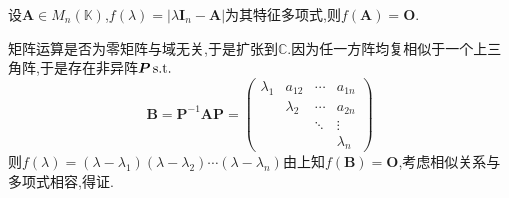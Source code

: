 \begin{formal}
\begin{theorem}\label{thm:Cayley-Hamilton定理}
    设$\bm{A}\in M_n\left(
        \mathbb{K}
    \right)$,$f\left(\lambda\right)=\left|
    \lambda\bm{I}_n-\bm{A}
    \right|$为其特征多项式,则$f\left(\bm{A}\right)=\bm{O}$.
\end{theorem}
\begin{Proof}
矩阵运算是否为零矩阵与域无关,于是扩张到$\mathbb{C}.$因为任一方阵均复相似于一个上三角阵,于是存在非异阵$\bm{P}\,\textup{s.t.}$
\[
\bm{B}=\bm{P}^{-1}\bm{AP}=\begin{pmatrix}
    \lambda_1&a_{12}&\cdots&a_{1n}\\
    &\lambda_2&\cdots&a_{2n}\\
    &&\ddots&\vdots\\
    &&&\lambda_n
\end{pmatrix}
\]则$f\left(\lambda\right)=
\left(
    \lambda-\lambda_1
\right)\left(
    \lambda-\lambda_2
\right)\cdots\left(
    \lambda-\lambda_n
\right)
    $由上知$f\left(\bm{B}\right)=\bm{O}$,考虑相似关系与多项式相容,得证.
\end{Proof}
\end{formal}
